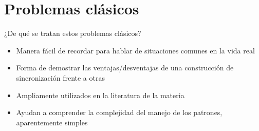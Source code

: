 \documentclass[presentation]{beamer}
\begin{document}
\section{Problemas clásicos}
\label{sec:org99f0a2c}
\begin{frame}[label={sec:orgbb6ec91}]{¿De qué se tratan estos problemas clásicos?}
\begin{itemize}
\item Manera fácil de recordar para hablar de situaciones comunes en la
vida real
\item Forma de demostrar las ventajas/desventajas de una construcción de
sincronización frente a otras
\item Ampliamente utilizados en la literatura de la materia
\item Ayudan a comprender la complejidad del manejo de los patrones,
aparentemente simples
\end{itemize}
\end{frame}
\end{document}
